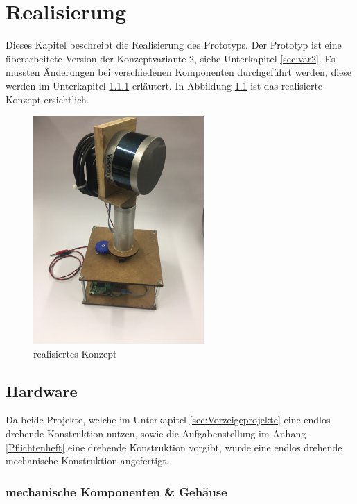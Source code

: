 \chapter{Realisierung}
\label{chap:Realisierung}
Dieses Kapitel beschreibt die Realisierung des Prototyps. Der Prototyp ist eine überarbeitete Version der Konzeptvariante 2, siehe Unterkapitel \ref{sec:var2}. Es mussten Änderungen bei verschiedenen Komponenten durchgeführt werden, diese werden im Unterkapitel \ref{sec:mechKomp} erläutert. In Abbildung \ref{fig:Gesamtbild} ist das realisierte Konzept ersichtlich.

\begin{figure}[H]
	\centering
	\includegraphics[angle=-90,width=0.58\textwidth]{resources/Gesamtbild.JPG}
	\caption[realisiertes Konzept]{realisiertes Konzept}
	\label{fig:Gesamtbild}
\end{figure} 


\section {Hardware}
\label{sec:Hardware}

Da beide Projekte, welche im Unterkapitel \ref{sec:Vorzeigeprojekte} eine endlos drehende Konstruktion nutzen, sowie die Aufgabenstellung im Anhang \ref{Pflichtenheft} eine drehende Konstruktion vorgibt, wurde eine endlos drehende mechanische Konstruktion angefertigt. 

\subsection {mechanische Komponenten \& Gehäuse}
\label{sec:mechKomp}

